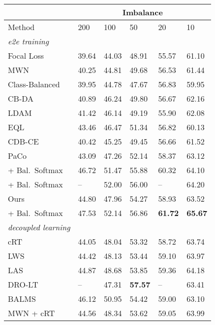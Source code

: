 \documentclass[10pt,twocolumn,letterpaper]{article}
\begin{document}
\begin{table}[t]
  \begin{center}
    {\small{
\begin{tabular}{llllll}
\toprule
&\multicolumn{5}{c}{Imbalance}\\
    \midrule
    Method &  200 & 100 & 50 & 20 & 10\\
    \midrule
    \textit{e2e training} \\
Focal Loss~\cite{focalloss} & 39.64 & 44.03 & 48.91 & 55.57 & 61.10  \\
    MWN~\cite{meta-weight-net} & 40.25 & 44.81 & 49.68 & 56.53 & 61.44\\
    Class-Balanced~\cite{classbalancedloss} &39.95 & 44.78 & 47.67 & 56.83 & 59.95\\
    CB-DA~\cite{jamal} & 40.89& 46.24 & 49.80 & 56.67 & 62.16\\
    LDAM~\cite{ldam-drw} & 41.42 & 46.14 & 49.19 & 55.90 & 62.08\\
EQL~\cite{eqlloss} & 43.46 & 46.47 & 51.34 & 56.82 & 60.13\\
    CDB-CE~\cite{cdb-ce} & 40.42 & 45.25 & 49.45 & 56.66 & 61.52 \\
PaCo~\cite{PaCo} & 43.09 & 47.26 & 52.14 & 58.37 & 63.12\\
    \hspace{1mm} + Bal.~Softmax~\cite{BALMS} & 46.72 & 51.47 & 55.88 & 60.32 & 64.10 \\
    \hspace{1mm} + Bal.~Softmax~\cite{BALMS} & -- & 52.00 & 56.00 & -- & 64.20\\
    Ours & 44.80 & 47.96 & 54.27 & 58.93 & 63.52 \\
    \hspace{1mm} + Bal.~Softmax & 47.53 & 52.14 & 56.86 & \textbf{61.72} & \textbf{65.67} \\
    \midrule
    \textit{decoupled learning}\\
cRT~\cite{decoupling} & 44.05 & 48.04 & 53.32 & 58.72 & 63.74 \\
     LWS~\cite{decoupling} & 44.42 & 48.13 & 53.44 & 59.10 & 63.97\\
     LAS~\cite{mislas} & 44.87& 48.68 & 53.85&59.36 & 64.18\\
     DRO-LT~\cite{dro-lt}  &-- & 47.31 & \textbf{57.57} & -- & 63.41 \\
BALMS~\cite{BALMS}  & 46.12 & 50.95 & 54.42 & 59.00 & 63.10\\
     MWN + cRT &44.56 & 48.34 &53.62 & 59.05 & 63.99 \\

\end{tabular}}}
\end{center}
\end{table}
\end{document}
